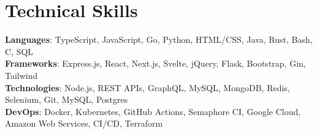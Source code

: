 \section{Technical Skills}
    \begin{itemize}[leftmargin=0.15in, label={}]
	\small{\item{
		\textbf{Languages}{: TypeScript, JavaScript, Go, Python, HTML/CSS, Java, Rust, Bash, C,  SQL} \\
		\textbf{Frameworks}{: Express.js, React, Next.js, Svelte, jQuery, Flask, Bootstrap, Gin, Tailwind} \\
		\textbf{Technologies}{: Node.js, REST APIs, GraphQL, MySQL, MongoDB, Redis, Selenium, Git, MySQL, Postgres} \\
		\textbf{DevOps}{: Docker, Kubernetes, GitHub Actions, Semaphore CI, Google Cloud, Amazon Web Services, CI/CD, Terraform}
	}}
    \end{itemize}
